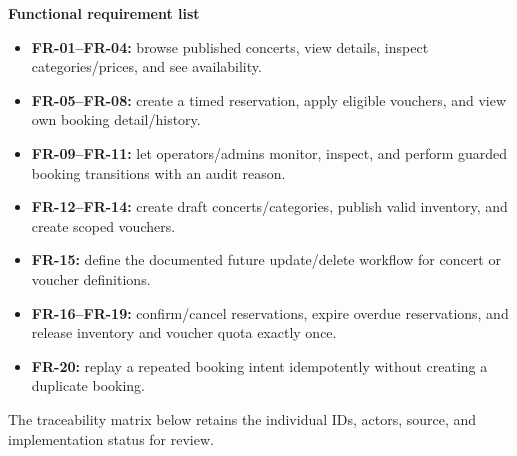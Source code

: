 \textbf{Functional requirement list}
\begin{itemize}[leftmargin=*,itemsep=0pt,topsep=2pt]
\item \textbf{FR-01--FR-04:} browse published concerts, view details, inspect categories/prices, and see availability.
\item \textbf{FR-05--FR-08:} create a timed reservation, apply eligible vouchers, and view own booking detail/history.
\item \textbf{FR-09--FR-11:} let operators/admins monitor, inspect, and perform guarded booking transitions with an audit reason.
\item \textbf{FR-12--FR-14:} create draft concerts/categories, publish valid inventory, and create scoped vouchers.
\item \textbf{FR-15:} define the documented future update/delete workflow for concert or voucher definitions.
\item \textbf{FR-16--FR-19:} confirm/cancel reservations, expire overdue reservations, and release inventory and voucher quota exactly once.
\item \textbf{FR-20:} replay a repeated booking intent idempotently without creating a duplicate booking.
\end{itemize}

The traceability matrix below retains the individual IDs, actors, source, and
implementation status for review.

